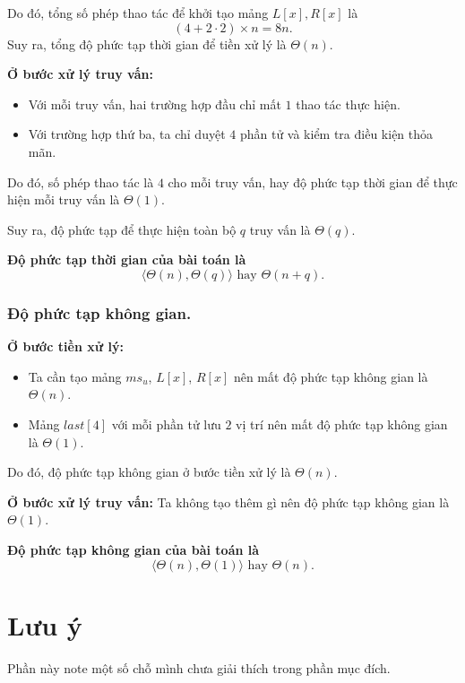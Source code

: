 \documentclass[12pt,a4paper]{article}
\begin{document}
	Do đó, tổng số phép thao tác để khởi tạo mảng $L[x], R[x]$ là 
	\[
	(4 + 2 \cdot 2) \times n = 8n.
	\]
	Suy ra, tổng độ phức tạp thời gian để tiền xử lý là $\Theta(n)$.
	
	\textbf{Ở bước xử lý truy vấn:}
	
	\begin{itemize}
		\item Với mỗi truy vấn, hai trường hợp đầu chỉ mất $1$ thao tác thực hiện.
		\item Với trường hợp thứ ba, ta chỉ duyệt $4$ phần tử và kiểm tra điều kiện thỏa mãn.
	\end{itemize}
	
	Do đó, số phép thao tác là $4$ cho mỗi truy vấn, hay độ phức tạp thời gian để thực hiện mỗi truy vấn là $\Theta(1)$.
	
	Suy ra, độ phức tạp để thực hiện toàn bộ $q$ truy vấn là $\Theta(q)$.
	
	
	\textbf{Độ phức tạp thời gian của bài toán là } 
	\[
	\langle \Theta(n), \Theta(q) \rangle 
	\text{ hay } \Theta(n + q).
	\]
	
	\subsubsection{Độ phức tạp không gian.}
	
	\textbf{Ở bước tiền xử lý:}
	
	\begin{itemize}
		\item Ta cần tạo mảng $ms_u$, $L[x]$, $R[x]$ nên mất độ phức tạp không gian là $\Theta(n)$.
		\item Mảng $last[4]$ với mỗi phần tử lưu $2$ vị trí nên mất độ phức tạp không gian là $\Theta(1)$.
	\end{itemize}
	
	Do đó, độ phức tạp không gian ở bước tiền xử lý là $\Theta(n)$.
	
	\textbf{Ở bước xử lý truy vấn:}
	Ta không tạo thêm gì nên độ phức tạp không gian là $\Theta(1)$.
	
	
	\textbf{Độ phức tạp không gian của bài toán là } 
	\[
	\langle \Theta(n), \Theta(1) \rangle 
	\text{ hay } \Theta(n).
	\]
	
	\section*{Lưu ý}
	Phần này note một số chỗ mình chưa giải thích trong phần mục đích.
	
\end{document}
